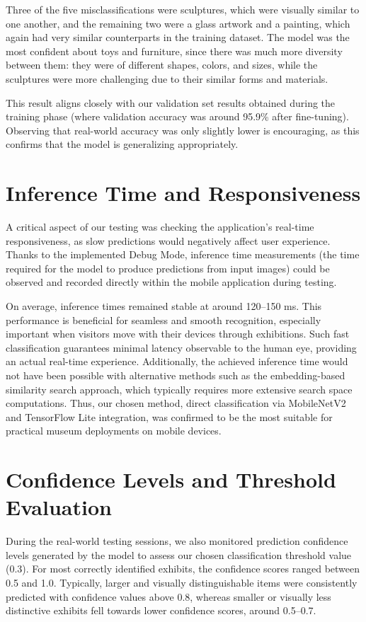 Three of the five misclassifications were sculptures, which were visually similar to one another, and the remaining two were a glass artwork and a painting, which again had very similar counterparts in the training dataset. The model was the most confident about toys and furniture, since there was much more diversity between them: they were of different shapes, colors, and sizes, while the sculptures were more challenging due to their similar forms and materials.

This result aligns closely with our validation set results obtained during the training phase (where validation accuracy was around 95.9\% after fine-tuning). Observing that real-world accuracy was only slightly lower is encouraging, as this confirms that the model is generalizing appropriately.

\section{Inference Time and Responsiveness}

A critical aspect of our testing was checking the application's real-time responsiveness, as slow predictions would negatively affect user experience. Thanks to the implemented Debug Mode, inference time measurements (the time required for the model to produce predictions from input images) could be observed and recorded directly within the mobile application during testing.

On average, inference times remained stable at around 120--150 ms. This performance is beneficial for seamless and smooth recognition, especially important when visitors move with their devices through exhibitions. Such fast classification guarantees minimal latency observable to the human eye, providing an actual real-time experience. Additionally, the achieved inference time would not have been possible with alternative methods such as the embedding-based similarity search approach, which typically requires more extensive search space computations. Thus, our chosen method, direct classification via MobileNetV2 and TensorFlow Lite integration, was confirmed to be the most suitable for practical museum deployments on mobile devices.

\section{Confidence Levels and Threshold Evaluation}

During the real-world testing sessions, we also monitored prediction confidence levels generated by the model to assess our chosen classification threshold value (0.3). For most correctly identified exhibits, the confidence scores ranged between 0.5 and 1.0. Typically, larger and visually distinguishable items were consistently predicted with confidence values above 0.8, whereas smaller or visually less distinctive exhibits fell towards lower confidence scores, around 0.5--0.7.

